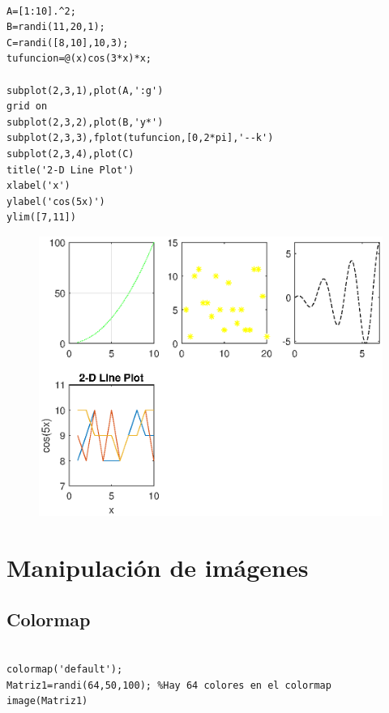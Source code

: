 \documentclass[11pt, a4paper,titlepage]{article}
\begin{document}
\begin{code}
\begin{verbatim}

A=[1:10].^2;
B=randi(11,20,1);
C=randi([8,10],10,3);
tufuncion=@(x)cos(3*x)*x;

subplot(2,3,1),plot(A,':g')
grid on
subplot(2,3,2),plot(B,'y*')
subplot(2,3,3),fplot(tufuncion,[0,2*pi],'--k')
subplot(2,3,4),plot(C)
title('2-D Line Plot')
xlabel('x')
ylabel('cos(5x)')
ylim([7,11])
\end{verbatim}%
\end{code}
\begin{figure}[h]
\includegraphics[width=\textwidth]{graf/g3.eps}

\end{figure}
\section{Manipulación de imágenes} 
\subsection{Colormap}
\begin{code}
\begin{verbatim}

colormap('default');
Matriz1=randi(64,50,100); %Hay 64 colores en el colormap
image(Matriz1)
\end{verbatim}
\end{code}
\end{document}
